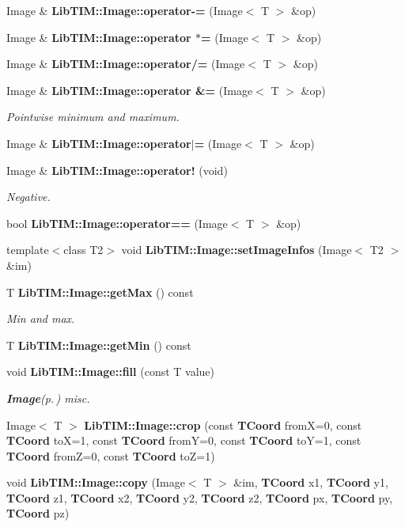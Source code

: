 \begin{CompactItemize}
Image \& {\bf Lib\-TIM::Image::operator-=} (Image$<$ T $>$ \&op)
\item 
Image \& {\bf Lib\-TIM::Image::operator $\ast$=} (Image$<$ T $>$ \&op)
\item 
Image \& {\bf Lib\-TIM::Image::operator/=} (Image$<$ T $>$ \&op)
\item 
Image \& {\bf Lib\-TIM::Image::operator \&=} (Image$<$ T $>$ \&op)
\begin{CompactList}\small\item\em Pointwise minimum and maximum. \item\end{CompactList}\item 
Image \& {\bf Lib\-TIM::Image::operator$|$=} (Image$<$ T $>$ \&op)
\item 
Image \& {\bf Lib\-TIM::Image::operator!} (void)
\begin{CompactList}\small\item\em Negative. \item\end{CompactList}\item 
bool {\bf Lib\-TIM::Image::operator==} (Image$<$ T $>$ \&op)
\item 
template$<$class T2$>$ void {\bf Lib\-TIM::Image::set\-Image\-Infos} (Image$<$ T2 $>$ \&im)
\item 
T {\bf Lib\-TIM::Image::get\-Max} () const 
\begin{CompactList}\small\item\em Min and max. \item\end{CompactList}\item 
T {\bf Lib\-TIM::Image::get\-Min} () const 
\item 
void {\bf Lib\-TIM::Image::fill} (const T value)
\begin{CompactList}\small\item\em {\bf Image}{\rm (p.\,\pageref{classLibTIM_1_1Image})} misc. \item\end{CompactList}\item 
Image$<$ T $>$ {\bf Lib\-TIM::Image::crop} (const {\bf TCoord} from\-X=0, const {\bf TCoord} to\-X=1, const {\bf TCoord} from\-Y=0, const {\bf TCoord} to\-Y=1, const {\bf TCoord} from\-Z=0, const {\bf TCoord} to\-Z=1)
\item 
void {\bf Lib\-TIM::Image::copy} (Image$<$ T $>$ \&im, {\bf TCoord} x1, {\bf TCoord} y1, {\bf TCoord} z1, {\bf TCoord} x2, {\bf TCoord} y2, {\bf TCoord} z2, {\bf TCoord} px, {\bf TCoord} py, {\bf TCoord} pz)

\end{CompactItemize}
